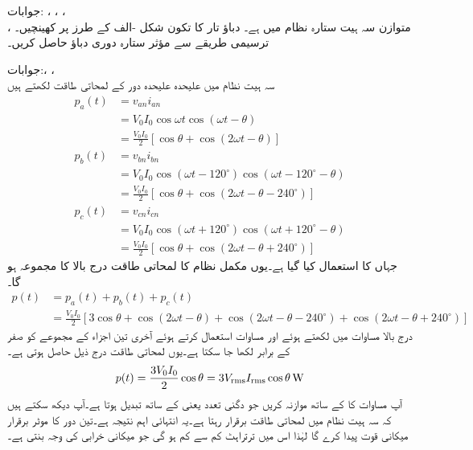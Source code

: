 جوابات: ، ، ، \\
، 
متوازن سہ ہیت  ستارہ نظام میں  ہے۔ دباؤ تار کا تکون شکل -الف کے طرز پر کھینچیں۔ترسیمی طریقے سے  مؤثر ستارہ دوری دباؤ حاصل کریں۔

جوابات:، ، \\ 
سہ ہیت نظام میں علیحدہ علیحدہ دور کے لمحاتی طاقت لکھتے ہیں 
\begin{align*}
p_a(t)&=v_{an}i_{an}\\
&=V_0 I_0 \cos \omega t \cos(\omega t -\theta)\\
&=\frac{V_0 I_0}{2}[\cos \theta +\cos(2\omega t -\theta)]\\
p_b(t)&=v_{bn}i_{bn}\\
&=V_0 I_0 \cos(\omega t -120^{\circ})\cos(\omega t-120^{\circ} -\theta)\\
&=\frac{V_0 I_0}{2}[\cos \theta +\cos(2\omega t -\theta-240^{\circ})]\\
p_c(t)&=v_{cn}i_{cn}\\
&=V_0 I_0 \cos (\omega t +120^{\circ})\cos(\omega t+120^{\circ} -\theta)\\
&=\frac{V_0 I_0}{2}[\cos \theta +\cos(2\omega t -\theta+240^{\circ})]
\end{align*}
جہاں  کا استعمال کیا گیا ہے۔یوں مکمل نظام کا لمحاتی طاقت  درج بالا کا مجموعہ ہو گا۔
\begin{align*}
p(t)&=p_a(t)+p_b(t)+p_c(t)\\
&=\frac{V_0 I_0}{2}[3\cos \theta +\cos(2\omega t-\theta)+\cos(2\omega t -\theta-240^{\circ})+\cos(2\omega t -\theta+240^{\circ})]
\end{align*}
درج بالا مساوات میں  لکھتے ہوئے اور مساوات  استعمال کرتے ہوئے آخری تین اجزاء کے مجموعے کو صفر کے برابر لکھا جا سکتا ہے۔یوں لمحاتی طاقت درج ذیل حاصل ہوتی ہے۔
\begin{align}\label{مساوات_تین_دوری_لمحاتی_طاقت_برقرار}
p(t)=\frac{3V_0 I_0}{2}\cos \theta =3 {V_{\textup{rms}}} {I_{\textup{rms}}} \cos \theta \,\si{\watt}
\end{align}
آپ مساوات  کا  کے ساتھ موازنہ کریں جو دگنی تعدد یعنی  کے ساتھ تبدیل ہوتا ہے۔آپ دیکھ سکتے ہیں کہ سہ ہیت نظام میں لمحاتی طاقت برقرار رہتا ہے۔یہ انتہائی اہم نتیجہ ہے۔تین دور کا موٹر برقرار میکانی قوت پیدا کرے گا لہٰذا اس میں ترتراہٹ کم سے کم ہو گی جو میکانی خرابی کی وجہ بنتی ہے۔

